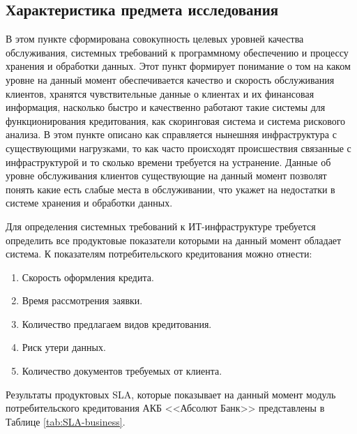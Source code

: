 \documentclass[14pt, a4paper]{extarticle}
\begin{document}
\subsection{Характеристика предмета исследования}

В этом пункте сформирована совокупность целевых уровней качества обслуживания,
системных требований к программному обеспечению и процессу хранения и обработки
данных. Этот пункт формирует понимание о том на каком уровне на данный момент
обеспечивается качество и скорость обслуживания клиентов, хранятся
чувствительные данные о клиентах и их финансовая информация, насколько быстро и
качественно работают такие системы для функционирования кредитования, как
скоринговая система и система рискового анализа. В этом пункте описано как
справляется нынешняя инфраструктура с существующими нагрузками, то как часто
происходят происшествия связанные с инфраструктурой и то сколько времени
требуется на устранение. Данные об уровне обслуживания клиентов существующие на
данный момент позволят понять какие есть слабые места в обслуживании, что
укажет на недостатки в системе хранения и обработки данных.

Для определения системных требований к ИТ-инфраструктуре требуется определить
все продуктовые показатели которыми на данный момент обладает система. К
показателям потребительского кредитования можно отнести: 
\begin{enumerate}
	\item Скорость оформления кредита.
	\item Время рассмотрения заявки.
	\item Количество предлагаем видов кредитования.
	\item Риск утери данных.
	\item Количество документов требуемых от клиента.
\end{enumerate}

Результаты продуктовых SLA, которые показывает на данный момент модуль
потребительского кредитования АКБ <<Абсолют Банк>> представлены в Таблице
\ref{tab:SLA-business}.
\end{document}
